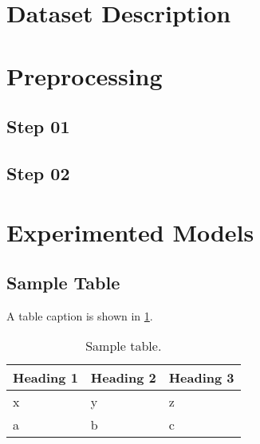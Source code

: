 \lipsum[2-4]

\section{Dataset Description}
\lipsum[1-1]

\section{Preprocessing}
\lipsum[1-1]
\subsection{Step 01}

\subsection{Step 02}

\section{Experimented Models}
\lipsum[1-1]

\subsection{Sample Table}
A table caption is shown in \ref{tab:sample-table}.
\begin{table}[H]
\centering
\caption{Sample table.}
\label{tab:sample-table}
\begin{tabular}{lll}
\toprule
\multicolumn{1}{c}{\textbf{Heading 1}} & \multicolumn{1}{c}{\textbf{Heading 2}} & \multicolumn{1}{c}{\textbf{Heading 3}} \\ \midrule
x                                      & y                                      & z                                      \\
a                                      & b                                      & c \\       \bottomrule                             
\end{tabular}
\end{table}